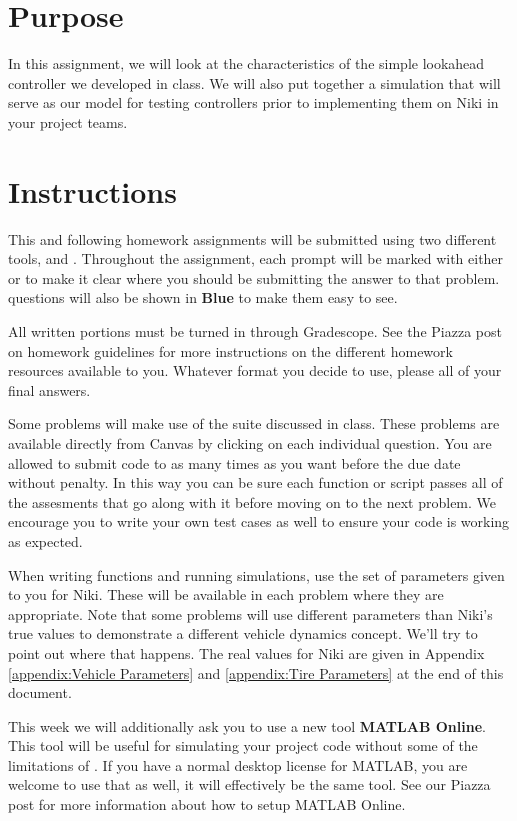 
\hspace{0.5cm}

\section*{Purpose}

In this assignment, we will look at the characteristics of the simple lookahead controller we developed in class. We will also put together a simulation that will serve as our model for testing controllers prior to implementing them on Niki in your project teams.

\section*{Instructions}

This and following homework assignments will be submitted using two different tools, \GSno{} and \GRno{}.
Throughout the assignment, each prompt will be marked with either \GS{} or \GR{} to make it clear
where you should be submitting the answer to that problem. \GRno{} questions will also be shown in
\textbf{\color{blue}Blue} to make them easy to see.

All written portions must be turned in through Gradescope. See the Piazza post on homework guidelines for more
instructions on the different homework resources available to you. Whatever format you decide to use, please  all of your final answers.

Some problems will make use of the \GRno{} suite discussed in class. These problems are available directly from Canvas
by clicking on each individual question.
You are allowed to submit code to \GRno{} as many times as you want before the due date without penalty. In this
way you can be sure each function or script passes all of the assesments that go along with it before moving on to the
next problem. We encourage you to write
your own test cases as well to ensure your code is working as expected. 

When writing functions and running simulations, use the set of parameters given to you for Niki. These will be available
in each \GRno{} problem where they are appropriate. Note that some problems will use different parameters than Niki's
true values to demonstrate a different vehicle dynamics concept. We'll try to point out where that happens. The real
values for Niki are given in Appendix \ref{appendix:Vehicle Parameters} and
\ref{appendix:Tire Parameters} at the end of this document.

This week we will additionally ask you to use a new tool \textbf{MATLAB Online}. This tool will be useful for simulating your project code without some of the limitations of \GRno{}. If you have a normal desktop license for MATLAB, you are welcome to use that as well, it will effectively be the same tool. See our Piazza post for more information about how to setup MATLAB Online.


\newpage
